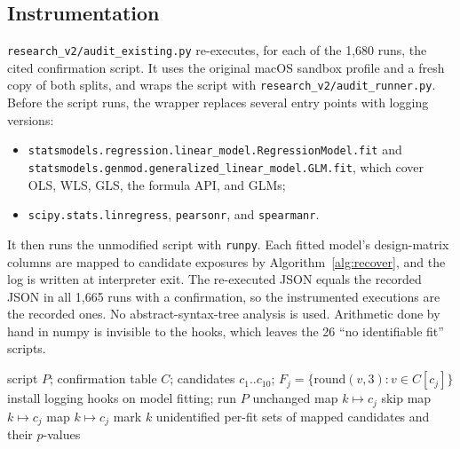 \subsection{Instrumentation}
\label{app:instr-method}
\texttt{research\_v2/audit\_existing.py} re-executes, for each of the 1,680
runs, the cited confirmation script. It uses the original macOS sandbox
profile and a fresh copy of both splits, and wraps the script with
\texttt{research\_v2/audit\_runner.py}. Before the script runs, the wrapper
replaces several entry points with logging versions:
\begin{itemize}
\item \texttt{statsmodels.regression.linear\_model.RegressionModel.fit} and
\texttt{statsmodels.genmod.generalized\_linear\_model.GLM.fit}, which cover
OLS, WLS, GLS, the formula API, and GLMs;
\item \texttt{scipy.stats.linregress}, \texttt{pearsonr}, and
\texttt{spearmanr}.
\end{itemize}
It then runs the unmodified script with \texttt{runpy}. Each fitted model's
design-matrix columns are mapped to candidate exposures by
Algorithm~\ref{alg:recover}, and the log is written at interpreter exit. The
re-executed JSON equals the recorded JSON in all 1,665 runs with a
confirmation, so the instrumented executions are the recorded ones. No
abstract-syntax-tree analysis is used. Arithmetic done by hand in numpy is
invisible to the hooks, which leaves the 26 ``no identifiable fit'' scripts.

\begin{algorithm}[h]
\caption{Recovering tested candidates from one re-executed v1 confirmation script}
\label{alg:recover}
\begin{algorithmic}[1]
\Require script $P$; confirmation table $C$; candidates $c_1..c_{10}$; $F_j=\{\mathrm{round}(v,3): v\in C[c_j]\}$
\State install logging hooks on model fitting; run $P$ unchanged
     \State map $k\mapsto c_j$ 
     \State skip 
     \State map $k\mapsto c_j$ 
     \State map $k\mapsto c_j$ 
    \Else \State mark $k$ unidentified
    \EndIf
  \EndFor
\EndFor
\State \Return per-fit sets of mapped candidates and their $p$-values
\end{algorithmic}
\end{algorithm}

